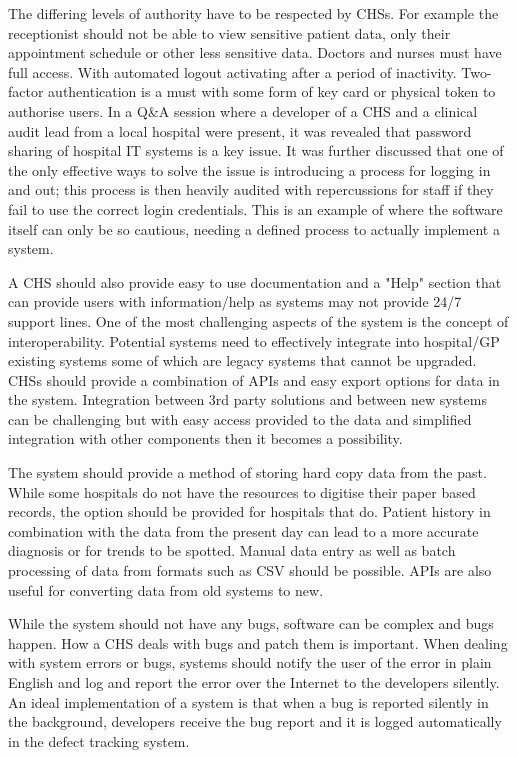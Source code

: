 The differing levels of authority have to be respected by CHSs. For example the receptionist should not be able to view sensitive patient data, only their appointment schedule or other less sensitive data. Doctors and nurses must have full access. With automated logout activating after a period of inactivity. Two-factor authentication is a must with some form of key card or physical token to authorise users. In a Q\&A session where a developer of a CHS and a clinical audit lead from a local hospital were present, it was revealed that password sharing of hospital IT systems is a key issue. It was further discussed that one of the only effective ways to solve the issue is introducing a process for logging in and out; this process is then heavily audited with repercussions for staff if they fail to use the correct login credentials. This is an example of where the software itself can only be so cautious, needing a defined process to actually implement a system.

A CHS should also provide easy to use documentation and a "Help" section that can provide users with information/help as systems may not provide 24/7 support lines.
One of the most challenging aspects of the system is the concept of interoperability. Potential systems need to effectively integrate into hospital/GP existing systems some of which are legacy systems that cannot be upgraded. CHSs should provide a combination of APIs and easy export options for data in the system. Integration between 3rd party solutions and between new systems can be challenging but with easy access provided to the data and simplified integration with other components then it becomes a possibility.

The system should provide a method of storing hard copy data from the past. While some hospitals do not have the resources to digitise their paper based records, the option should be provided for hospitals that do. Patient history in combination with the data from the present day can lead to a more accurate diagnosis or for trends to be spotted. Manual data entry as well as batch processing of data from formats such as CSV should be possible. APIs are also useful for converting data from old systems to new.

While the system should not have any bugs, software can be complex and bugs happen. How a CHS deals with bugs and patch them is important. When dealing with system errors or bugs, systems should notify the user of the error in plain English and log and report the error over the Internet to the developers silently. An ideal implementation of a system is that when a bug is reported silently in the background, developers receive the bug report and it is logged automatically in the defect tracking system.

